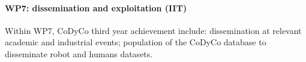 

\paragraph*{WP7: dissemination and exploitation (IIT)}

Within WP7, CoDyCo third year achievement include: dissemination at relevant academic and industrial events; population of the CoDyCo database to disseminate robot and humans datasets. 
